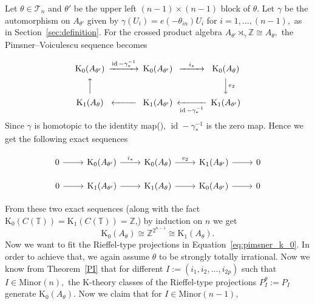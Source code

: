 \documentclass[9pt, BCOR=2mm]{amsart}
\numberwithin{equation}{section}
\numberwithin{equation}{section}
\newcommand{\Z}{{\mathbb{Z}}}
\newcommand{\T}{{\mathbb{T}}}
\newcommand{\K}{\mathrm{K}} %
\DeclareMathOperator{\id}{id}
\begin{document}
Let $\theta\in \mathcal{T}_n$ and $\theta'$ be  the  upper left $(n-1) \times (n-1)$ block of $\theta.$
Let $\gamma$ be the automorphism on $A_{\theta'}$ given by
$\gamma (U_i) = e(-\theta_{in}) U_i$ for $ i=1,\dots,(n-1),$ as in Section~\ref{sec:definition}. For the crossed product algebra $A_{\theta'}\rtimes_\gamma \Z\cong A_{\theta},$
the Pimsner--Voiculescu sequence becomes

\[
\begin{CD}
\K_0(A_{\theta'}) @>{\id -\gamma_{*}^{-1}}>>\K_0(A_{\theta'})@>{i_*}>> \K_0 (A_\theta)   \\
@A{}AA & &  @VV{e_2}V            \\
 \K_1(A_\theta)@<<{}<  \K_1(A_{\theta'}) @<<{\id -\gamma_{*}^{-1}}< \K_1(A_{\theta'})
\end{CD}
\]
Since $\gamma$ is homotopic to the identity map(\cite[Lemma 1.5]{Phi06}), $\id -\gamma_{*}^{-1}$
is the zero map. Hence we get the following exact sequences

\begin{center}
\begin{equation}\label{eq:pimsner_k_0}
	\begin{tikzcd}
  0 \arrow{r} & \K_0(A_{\theta'}) \arrow[r, "i_*"] & \K_0(A_{\theta}) \arrow[r, "e_2"] & \K_1(A_{\theta'})          \arrow{r} & 0 
    \end{tikzcd}
    \end{equation}
    	\end{center}
    	
\begin{center}
\begin{equation}\label{eq:pimsner_k_1}
	\begin{tikzcd}
  0 \arrow{r} & \K_1(A_{\theta'}) \arrow{r} & \K_1(A_{\theta}) \arrow{r}& \K_0(A_{\theta'})          \arrow{r} & 0 
    \end{tikzcd}
    \end{equation}
    	\end{center}
From these two exact sequences (along with the fact $\K_0(C(\T)) = \K_1(C(\T)) = \Z$,) by induction on $n$ we get
\begin{equation}
\K_0(A_\theta)\cong \Z^{2^{n-1}} \cong \K_1(A_\theta).
\end{equation}
Now we want to fit the Rieffel-type projections in Equation~\ref{eq:pimsner_k_0}. In order to achieve that, we again assume $\theta$ to be strongly totally irrational. Now we know from Theorem~\ref{PI} that for different $I:=\left(i_{1}, i_{2}, \ldots, i_{2 p}\right)$ such that $ I\in \mathrm{Minor}(n),$ the $\K$-theory classes of the Rieffel-type projections $P_{I}^{\theta}:=P_{I}$  generate $\K_0(A_\theta).$ Now we claim that for $I\in \mathrm{Minor}(n-1),$ 
\end{document}
